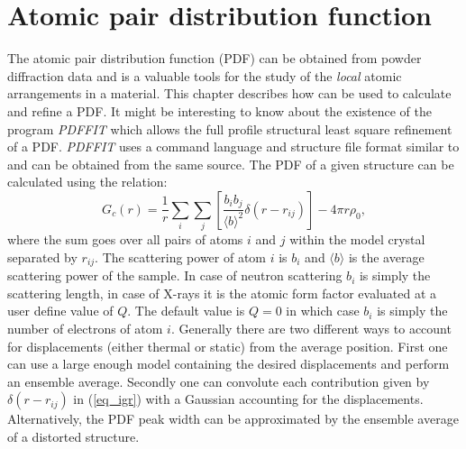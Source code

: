 
\chapter{Atomic pair distribution function \label{pdf}}

The atomic pair distribution function (PDF) can be obtained from
powder diffraction data and is a valuable tools for the study of the
{\it local} atomic arrangements in a material. This chapter
describes how \Discus can be used to calculate and refine a
PDF. It might be interesting to know about the existence of the
program {\it PDFFIT} \citep{prbi99} which allows the full profile
structural least square refinement of a PDF. {\it PDFFIT} uses a
command language and structure file format similar to \Discus
and can be obtained from the same source. The PDF of a given
structure can be calculated using the relation:
%
\begin{equation}
  G_{c}(r) = \frac{1}{r} \sum_{i}\sum_{j} \left [
             \frac{b_{i}b_{j}}{\langle b \rangle ^{2}}
             \delta (r - r_{ij}) \right ]   - 4 \pi r \rho_{0},
  \label{eq_igr}
\end{equation}
%
where the sum goes over all pairs of atoms $i$ and $j$ within the
model crystal separated by $r_{ij}$. The scattering power of atom
$i$ is $b_{i}$ and $\langle b \rangle$ is the average scattering
power of the sample. In case of neutron scattering $b_{i}$ is simply
the scattering length, in case of X-rays it is the atomic form
factor evaluated at a user define value of $Q$. The default value is
$Q=0$ in which case $b_{i}$ is simply the number of electrons of
atom $i$. Generally there are two different ways to account for
displacements (either thermal or static) from the average position.
First one can use a large enough model containing the desired
displacements and perform an ensemble average. Secondly one can
convolute each contribution given by $\delta (r - r_{ij})$ in
(\ref{eq_igr}) with a Gaussian accounting for the displacements.
Alternatively, the PDF peak width can be approximated by the ensemble
average of a distorted structure. \par

